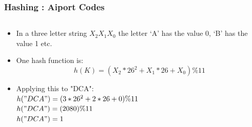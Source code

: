 \begin{frame}[fragile]
\frametitle{Hashing : Aiport Codes}
\begin{columns}[T]

\begin{column}{0.35\textwidth}
\begin{itemize}[<+->]
\item In a three letter string $X_2 X_1 X_0$ the letter `A' has the value 0, `B' has the
value 1 etc.
\item One hash function is:
\[
h(K) = (X_2*26^2 + X_1*26 + X_0)\%11
\]
\item Applying this to "DCA":\\

$ h("DCA") = (3*26^2 + 2*26 + 0)\%11$\\

$ h("DCA") = (2080)\%11$\\

$ h("DCA") = 1 $
\end{itemize}
\end{column}


\end{columns}
\end{frame}
